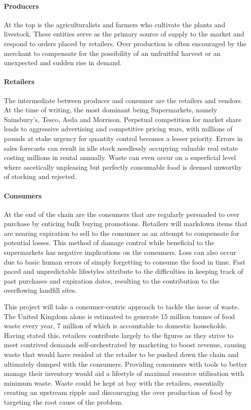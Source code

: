 \documentclass[a4paper, 11pt]{article}
\begin{document}
\paragraph{Producers}At the top is the agriculturalists and farmers who cultivate the plants and livestock. These entities serve as the primary source of supply to the market and respond to orders placed by retailers. Over production is often encouraged by the merchant to compensate for the possibility of an unfruitful harvest or an unexpected and sudden rise in demand.\cite{waste} 

\paragraph{Retailers}The intermediate between producer and consumer are the retailers and vendors. At the time of writing, the most dominant being Supermarkets, namely Sainsbury's, Tesco, Asda and Morrison. Perpetual competition for market share leads to aggressive advertising and competitive pricing wars, with millions of pounds at stake urgency for quantity control becomes a lesser priority. Errors in sales forecasts can result in idle stock needlessly occupying valuable real estate costing millions in rental annually. Waste can even occur on a superficial level where ascetically unpleasing but perfectly consumable food is deemed unworthy of stocking and rejected.\cite{FoodWaste} 

\paragraph{Consumers}At the end of the chain are the consumers that are regularly persuaded to over purchase by enticing bulk buying promotions. Retailers will markdown items that are nearing expiration to sell to the consumer as an attempt to compensate for potential losses. This method of damage control while beneficial to the supermarkets has negative implications on the consumers. Loss can also occur due to basic human errors of simply forgetting to consume the food in time. Fast paced and unpredictable lifestyles attribute to the difficulties in keeping track of past purchases and expiration dates, resulting to the contribution to the overflowing landfill sites.\cite{FoodWaste} 

\vspace{\baselineskip}

This project will take a consumer-centric approach to tackle the issue of waste. The United Kingdom alone is estimated to generate 15 million tonnes of food waste every year, 7 million of which is accountable to domestic households.\cite{statistic} Having stated this, retailers contribute largely to the figures as they strive to meet contrived demands self-orchestrated by marketing to boost revenue, causing waste that would have resided at the retailer to be pushed down the chain and ultimately dumped with the consumers.\cite{waste} Providing consumers with tools to better manage their inventory would aid a lifestyle of maximal resource utilisation with minimum waste. Waste could be kept at bay with the retailers, essentially creating an upstream ripple and discouraging the over production of food by targeting the root cause of the problem.
\end{document}
